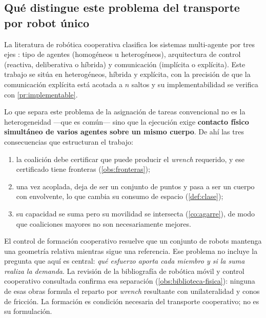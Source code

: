 \subsection{Qué distingue este problema del transporte por robot único}

La literatura de robótica cooperativa clasifica los sistemas multi-agente por
tres ejes \cite{gorrostieta2019applications}: tipo de agentes (homogéneos u
heterogéneos), arquitectura de control (reactiva, deliberativa o híbrida) y
comunicación (implícita o explícita). Este trabajo se sitúa en heterogéneos,
híbrida y explícita, con la precisión de que la comunicación explícita está
acotada a $n$ saltos y su implementabilidad se verifica con
\cref{pr:implementable}.

Lo que separa este problema de la asignación de tareas convencional no es la
heterogeneidad —que es común— sino que la ejecución exige \textbf{contacto físico simultáneo de varios agentes sobre un mismo cuerpo}. De ahí las tres
consecuencias que estructuran el trabajo:

\begin{enumerate}[leftmargin=1.9em,topsep=0.2em,itemsep=0.3em]
  \item la coalición debe certificar que puede producir el \emph{wrench}
  requerido, y ese certificado tiene fronteras (\cref{obs:fronteras});
  \item una vez acoplada, deja de ser un conjunto de puntos y pasa a ser un
  cuerpo con envolvente, lo que cambia su consumo de espacio
  (\cref{def:clase});
  \item su capacidad se suma pero su movilidad se intersecta
  (\cref{co:agarre}), de modo que coaliciones mayores no son necesariamente
  mejores.
\end{enumerate}

\begin{observacion}
\label{obs:frontera-formacion}
El control de formación cooperativo resuelve que un conjunto de robots mantenga
una geometría relativa mientras sigue una referencia. Ese problema no incluye la
pregunta que aquí es central: \emph{qué esfuerzo aporta cada miembro y si la
suma realiza la demanda}. La revisión de la bibliografía de robótica móvil y
control cooperativo consultada confirma esa separación
(\cref{obs:biblioteca-fisica}): ninguna de esas obras formula el reparto por
\emph{wrench} resultante con unilateralidad y conos de fricción. La formación
es condición necesaria del transporte cooperativo; no es su formulación.
\end{observacion}

